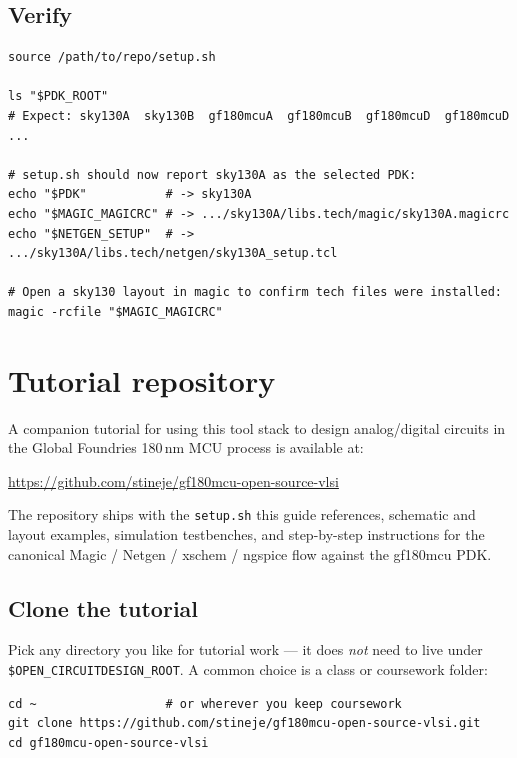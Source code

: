 \documentclass[11pt]{article}
\begin{document}
\subsection{Verify}

\begin{lstlisting}
source /path/to/repo/setup.sh

ls "$PDK_ROOT"
# Expect: sky130A  sky130B  gf180mcuA  gf180mcuB  gf180mcuD  gf180mcuD  ...

# setup.sh should now report sky130A as the selected PDK:
echo "$PDK"           # -> sky130A
echo "$MAGIC_MAGICRC" # -> .../sky130A/libs.tech/magic/sky130A.magicrc
echo "$NETGEN_SETUP"  # -> .../sky130A/libs.tech/netgen/sky130A_setup.tcl

# Open a sky130 layout in magic to confirm tech files were installed:
magic -rcfile "$MAGIC_MAGICRC"
\end{lstlisting}

\section{Tutorial repository}

A companion tutorial for using this tool stack to design analog/digital
circuits in the Global Foundries 180\,nm MCU process is available at:

\begin{center}
\url{https://github.com/stineje/gf180mcu-open-source-vlsi}
\end{center}

\noindent The repository ships with the \texttt{setup.sh} this guide
references, schematic and layout examples, simulation testbenches, and
step-by-step instructions for the canonical Magic / Netgen / xschem /
ngspice flow against the gf180mcu PDK.

\subsection{Clone the tutorial}

Pick any directory you like for tutorial work --- it does \emph{not} need
to live under \texttt{\$OPEN\_CIRCUITDESIGN\_ROOT}. A common choice is a
class or coursework folder:

\begin{lstlisting}
cd ~                  # or wherever you keep coursework
git clone https://github.com/stineje/gf180mcu-open-source-vlsi.git
cd gf180mcu-open-source-vlsi
\end{lstlisting}
\end{document}
